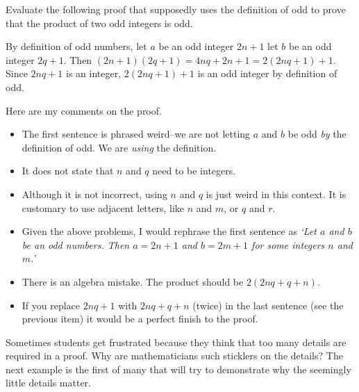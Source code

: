 \begin{eval}
Evaluate the following proof that supposedly
uses the definition of odd to prove that the product of two odd integers is odd.
\begin{spf}
By definition of odd numbers, 
let $a$ be an odd integer 
$2n+1$ 
let $b$ be an odd integer 
$2q+1$.
Then $(2n+1)(2q+1)=4nq+2n+1=2(2nq+1)+1$.
Since $2nq+1$ is an integer, $2(2nq+1)+1$ is an odd integer by definition of odd.
\end{spf}
\evallinetwo

\begin{answer}
Here are my comments on the proof.
\begin{itemize}
\item
The first sentence is phrased weird--we are not letting $a$ and $b$ be odd {\em by} the definition of odd.
We are {\em using} the definition.  
\item
It does not state that $n$ and $q$ need to be integers.
\item
Although it is not incorrect, using $n$ and $q$ is just weird in this context.  
It is customary to use adjacent letters, like $n$ and $m$, or $q$ and $r$.
\item
Given the above problems, I would rephrase the first sentence as 
{\em `Let $a$ and $b$ be an odd numbers.  
Then $a=2n+1$ and $b=2m+1$ for some integers $n$ and $m$.'}
\item
There is an algebra mistake.  The product should be $2(2nq+q+n)$.
\item
If you replace $2nq+1$ with $2nq+q+n$ (twice) in the last sentence (see the previous item)
it would be a perfect finish to the proof.
\end{itemize}
\end{answer}
\end{eval}

Sometimes students get frustrated because they think that too many details are required in a proof.  
Why are mathematicians such sticklers on the details?  The next example is the first of many
that will try to demonstrate why the seemingly little details matter.


